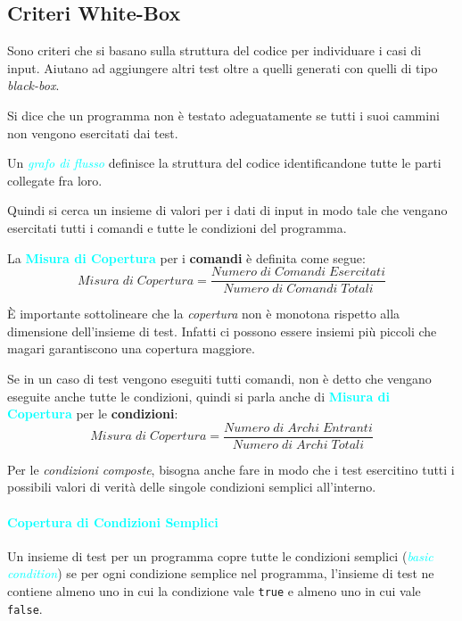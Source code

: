 \subsection{Criteri White-Box}

Sono criteri che si basano sulla struttura del codice per individuare
i casi di input. Aiutano ad aggiungere altri test oltre a quelli generati
con quelli di tipo \emph{black-box}.

Si dice che un programma non è testato adeguatamente se tutti i suoi cammini
non vengono esercitati dai test.

Un \emph{\textcolor{cyan}{grafo di flusso}} definisce la struttura
del codice identificandone tutte le parti collegate fra loro.

Quindi si cerca un insieme di valori per i dati di input in modo tale che
vengano esercitati tutti i comandi e tutte le condizioni del programma.

La \textbf{\textcolor{cyan}{Misura di Copertura}} per i \textbf{comandi} è definita come segue:
\begin{equation*}
    Misura\;di\;Copertura = \frac{Numero\;di\;Comandi\;Esercitati}{Numero\;di\;Comandi\;Totali}
\end{equation*}

È importante sottolineare che la \emph{copertura} non è monotona rispetto
alla dimensione dell'insieme di test. Infatti ci possono essere insiemi più piccoli
che magari garantiscono una copertura maggiore.

Se in un caso di test vengono eseguiti tutti comandi, non è detto che vengano
eseguite anche tutte le condizioni, quindi si parla anche di \textbf{\textcolor{cyan}{Misura di Copertura}}
per le \textbf{condizioni}:
\begin{equation*}
    Misura\;di\;Copertura = \frac{Numero\;di\;Archi\;Entranti}{Numero\;di\;Archi\;Totali}
\end{equation*}

Per le \emph{condizioni composte}, bisogna anche fare in modo che i test
esercitino tutti i possibili valori di verità delle singole condizioni semplici all'interno.

\paragraph{\textcolor{cyan}{Copertura di Condizioni Semplici}} Un insieme di test
per un programma copre tutte le condizioni semplici (\emph{\textcolor{cyan}{basic condition}})
se per ogni condizione semplice nel programma, l'insieme di test ne contiene almeno
uno in cui la condizione vale \verb|true| e almeno uno in cui vale \verb|false|.

